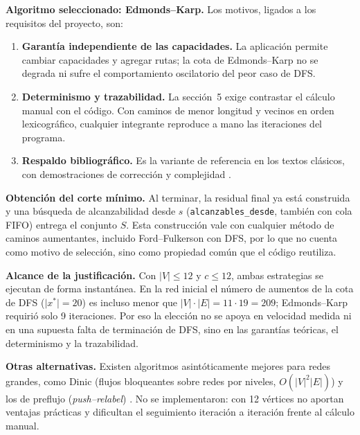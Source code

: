 \documentclass[12pt, a4paper]{article}
\begin{document}
\textbf{Algoritmo seleccionado: Edmonds--Karp.} Los motivos, ligados a los requisitos del proyecto, son:
\begin{enumerate}
  \item \textbf{Garantía independiente de las capacidades.} La aplicación permite cambiar capacidades y agregar rutas; la cota de Edmonds--Karp no se degrada ni sufre el comportamiento oscilatorio del peor caso de DFS.
  \item \textbf{Determinismo y trazabilidad.} La sección~5 exige contrastar el cálculo manual con el código. Con caminos de menor longitud y vecinos en orden lexicográfico, cualquier integrante reproduce a mano las iteraciones del programa.
  \item \textbf{Respaldo bibliográfico.} Es la variante de referencia en los textos clásicos, con demostraciones de corrección y complejidad \cite{edmondskarp1972, clrs2009, kleinberg2006, ahuja1993}.
\end{enumerate}

\textbf{Obtención del corte mínimo.} Al terminar, la residual final ya está construida y una búsqueda de alcanzabilidad desde $s$ (\texttt{alcanzables\_desde}, también con cola FIFO) entrega el conjunto $S$. Esta construcción vale con cualquier método de caminos aumentantes, incluido Ford--Fulkerson con DFS, por lo que no cuenta como motivo de selección, sino como propiedad común que el código reutiliza.

\textbf{Alcance de la justificación.} Con $\lvert V\rvert \le 12$ y $c \le 12$, ambas estrategias se ejecutan de forma instantánea. En la red inicial el número de aumentos de la cota de DFS ($\lvert x^*\rvert = 20$) es incluso menor que $\lvert V\rvert\cdot\lvert E\rvert = 11\cdot 19 = 209$; Edmonds--Karp requirió solo 9 iteraciones. Por eso la elección no se apoya en velocidad medida ni en una supuesta falta de terminación de DFS, sino en las garantías teóricas, el determinismo y la trazabilidad.

\textbf{Otras alternativas.} Existen algoritmos asintóticamente mejores para redes grandes, como Dinic \cite{dinic1970} (flujos bloqueantes sobre redes por niveles, $O(\lvert V\rvert^2\lvert E\rvert)$) y los de preflujo (\emph{push--relabel}) \cite{ahuja1993, clrs2009}. No se implementaron: con 12 vértices no aportan ventajas prácticas y dificultan el seguimiento iteración a iteración frente al cálculo manual.

\end{document}
